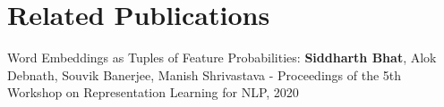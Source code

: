 \documentclass[11pt]{book}
\begin{document}
\chapter*{Related Publications}
\label{ch:relatedPubs}
% 


Word Embeddings as Tuples of Feature Probabilities: \textbf{Siddharth Bhat},
Alok Debnath, Souvik Banerjee, Manish Shrivastava - Proceedings of the 5th
Workshop on Representation Learning for NLP, 2020


\nocite{*}

% 

\end{document}

